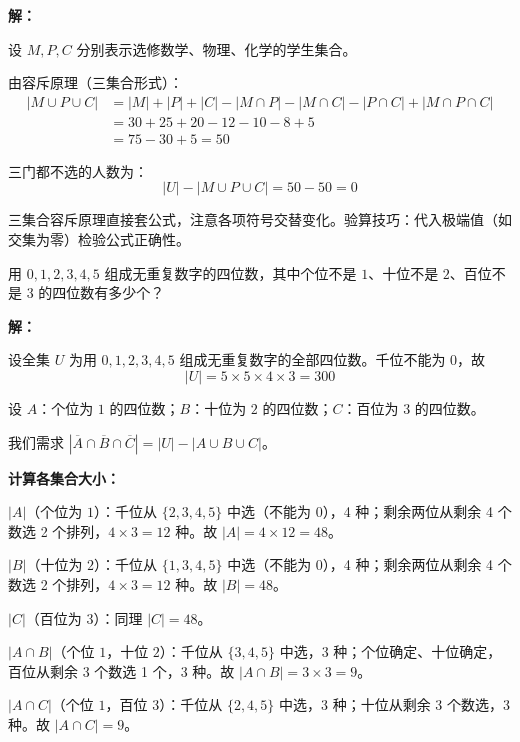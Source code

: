 \documentclass[12pt, a4paper]{ctexart}
\begin{document}
\textbf{解：}

设 \(M, P, C\) 分别表示选修数学、物理、化学的学生集合。

由容斥原理（三集合形式）：
\begin{align*}
|M \cup P \cup C| &= |M|+|P|+|C| - |M\cap P|-|M\cap C|-|P\cap C| + |M\cap P\cap C| \\
&= 30+25+20 - 12-10-8 + 5 \\
&= 75 - 30 + 5 = 50
\end{align*}

三门都不选的人数为：
\[
|U| - |M \cup P \cup C| = 50 - 50 = \boxed{0}
\]

\begin{tipbox}[方法总结]
三集合容斥原理直接套公式，注意各项符号交替变化。验算技巧：代入极端值（如交集为零）检验公式正确性。
\end{tipbox}

\vspace{6pt}

\begin{examplebox}
用 \(0,1,2,3,4,5\) 组成无重复数字的四位数，其中个位不是 \(1\)、十位不是 \(2\)、百位不是 \(3\) 的四位数有多少个？
\end{examplebox}

\textbf{解：}

设全集 \(U\) 为用 \(0,1,2,3,4,5\) 组成无重复数字的全部四位数。千位不能为 \(0\)，故
\[
|U| = 5 \times 5 \times 4 \times 3 = 300
\]

设 \(A\)：个位为 \(1\) 的四位数；\(B\)：十位为 \(2\) 的四位数；\(C\)：百位为 \(3\) 的四位数。

我们需求 \(|\overline{A} \cap \overline{B} \cap \overline{C}| = |U| - |A \cup B \cup C|\)。

\textbf{计算各集合大小：}

\(|A|\)（个位为 \(1\)）：千位从 \(\{2,3,4,5\}\) 中选（不能为 \(0\)），4 种；剩余两位从剩余 4 个数选 2 个排列，\(4 \times 3=12\) 种。故 \(|A|=4\times 12=48\)。

\(|B|\)（十位为 \(2\)）：千位从 \(\{1,3,4,5\}\) 中选（不能为 \(0\)），4 种；剩余两位从剩余 4 个数选 2 个排列，\(4\times 3=12\) 种。故 \(|B|=48\)。

\(|C|\)（百位为 \(3\)）：同理 \(|C|=48\)。

\(|A\cap B|\)（个位 \(1\)，十位 \(2\)）：千位从 \(\{3,4,5\}\) 中选，3 种；个位确定、十位确定，百位从剩余 3 个数选 1 个，3 种。故 \(|A\cap B|=3\times 3=9\)。

\(|A\cap C|\)（个位 \(1\)，百位 \(3\)）：千位从 \(\{2,4,5\}\) 中选，3 种；十位从剩余 3 个数选，3 种。故 \(|A\cap C|=9\)。
\end{document}
